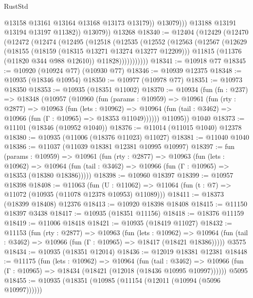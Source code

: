 \begin{lexlean}{RustStd}
\begin{coremodule}
{{{{{{{{{{{{{{{{{{{                      @13158
                      @13161
                      @13164
                      @13168
                      @13173
                      @13179))
                  @13079)))
            @13188
            @13191
            @13194
            @13197
            @11382))
        @13079))
    @13268
@18340 := @12404
    (@12429
      (@12470
        (@12472
          (@12474
            (@12495
              (@12518
                (@12535
                  (@12552
                    (@12563
                      (@12567
                        (@12629
                          (@18155 (@18159 (@18315 @13271 @13274 @13277 @12209)))
                          @11815
                          (@11376 (@11820 @344 @988 @12610))
                          @11828)))))))))))
@18341 := @10918 @77
@18345 := @10920 (@10924 @77) (@10930 @77)
@18346 := @10939 @12375
@18348 := @10935 (@18346 @10954)
@18350 := @10977 (@10978 @77)
@18351 := @10973 @18350
@18353 := @10935 (@18351 @11002)
@18370 := @10934
    (fun (fn : @237) =>
    @18348
      (@10957
        (@10960
          (fun (params : @10959) =>
          @10961
            (fun (rty : @2877) =>
            @10963
              (fun (lets : @10962) =>
              @10964 (fun (tail : @3462) => @10966 (fun (Γ : @10965) => @18353 @11049))))))
        @11095))
    @1040
@18373 := @11101 (@18346 (@10952 @1040))
@18376 := @11014 (@11015 @1040) @12378
@18380 := @10935 (@11006 (@18376 @11023) @11027)
@18381 := @11040 @1040
@18386 := @11037 (@11039 @18381 @12381 @10995 @10997)
@18397 := fun (params : @10959) =>
  @10961
    (fun (rty : @2877) =>
    @10963
      (fun (lets : @10962) =>
      @10964 (fun (tail : @3462) => @10966 (fun (Γ : @10965) => @18353 (@18380 @18386)))))
@18398 := @10960 @18397
@18399 := @10957 @18398
@18408 := @11063
    (fun (U : @11062) => @11064 (fun (t : @7) => @11072 (@10935 (@11078 @12378 @10953) @11089)))
@18411 := @18373 (@18399 @18408) @12376
@18413 := @10920 @18398 @18408
@18415 := @11150 @18397 @3438
@18417 := @10935 (@18351 @11156)
@18418 := @18376 @11159
@18419 := @11006 @18418
@18421 := @10935 (@18419 @11027)
@18432 := @11153
    (fun (rty : @2877) =>
    @10963
      (fun (lets : @10962) =>
      @10964 (fun (tail : @3462) => @10966 (fun (Γ : @10965) => @18417 (@18421 @18386)))))
    @3575
@18434 := @10935 (@18351 @12014)
@18436 := @12019 @18381 @12381
@18448 := @11175
    (fun (lets : @10962) =>
    @10964
      (fun (tail : @3462) =>
      @10966 (fun (Γ : @10965) => @18434 (@18421 (@12018 (@18436 @10995 @10997))))))
    @5095
@18455 := @10935 (@18351 (@10985 (@11154 (@12011 (@10994 (@5096 @10997))))))
}}}}}}}}}}}}}}}}}}}
\end{coremodule}
\end{lexlean}
